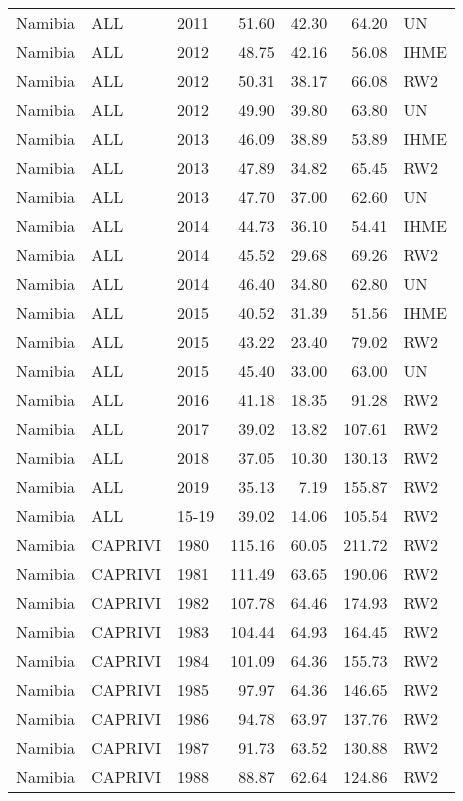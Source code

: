 \begin{longtable}{lllrrrl}
  Namibia & ALL & 2011 & 51.60 & 42.30 & 64.20 & UN \\ 
  Namibia & ALL & 2012 & 48.75 & 42.16 & 56.08 & IHME \\ 
  Namibia & ALL & 2012 & 50.31 & 38.17 & 66.08 & RW2 \\ 
  Namibia & ALL & 2012 & 49.90 & 39.80 & 63.80 & UN \\ 
  Namibia & ALL & 2013 & 46.09 & 38.89 & 53.89 & IHME \\ 
  Namibia & ALL & 2013 & 47.89 & 34.82 & 65.45 & RW2 \\ 
  Namibia & ALL & 2013 & 47.70 & 37.00 & 62.60 & UN \\ 
  Namibia & ALL & 2014 & 44.73 & 36.10 & 54.41 & IHME \\ 
  Namibia & ALL & 2014 & 45.52 & 29.68 & 69.26 & RW2 \\ 
  Namibia & ALL & 2014 & 46.40 & 34.80 & 62.80 & UN \\ 
  Namibia & ALL & 2015 & 40.52 & 31.39 & 51.56 & IHME \\ 
  Namibia & ALL & 2015 & 43.22 & 23.40 & 79.02 & RW2 \\ 
  Namibia & ALL & 2015 & 45.40 & 33.00 & 63.00 & UN \\ 
  Namibia & ALL & 2016 & 41.18 & 18.35 & 91.28 & RW2 \\ 
  Namibia & ALL & 2017 & 39.02 & 13.82 & 107.61 & RW2 \\ 
  Namibia & ALL & 2018 & 37.05 & 10.30 & 130.13 & RW2 \\ 
  Namibia & ALL & 2019 & 35.13 & 7.19 & 155.87 & RW2 \\ 
  Namibia & ALL & 15-19 & 39.02 & 14.06 & 105.54 & RW2 \\ 
  Namibia & CAPRIVI & 1980 & 115.16 & 60.05 & 211.72 & RW2 \\ 
  Namibia & CAPRIVI & 1981 & 111.49 & 63.65 & 190.06 & RW2 \\ 
  Namibia & CAPRIVI & 1982 & 107.78 & 64.46 & 174.93 & RW2 \\ 
  Namibia & CAPRIVI & 1983 & 104.44 & 64.93 & 164.45 & RW2 \\ 
  Namibia & CAPRIVI & 1984 & 101.09 & 64.36 & 155.73 & RW2 \\ 
  Namibia & CAPRIVI & 1985 & 97.97 & 64.36 & 146.65 & RW2 \\ 
  Namibia & CAPRIVI & 1986 & 94.78 & 63.97 & 137.76 & RW2 \\ 
  Namibia & CAPRIVI & 1987 & 91.73 & 63.52 & 130.88 & RW2 \\ 
  Namibia & CAPRIVI & 1988 & 88.87 & 62.64 & 124.86 & RW2 \\ 

\end{longtable}
